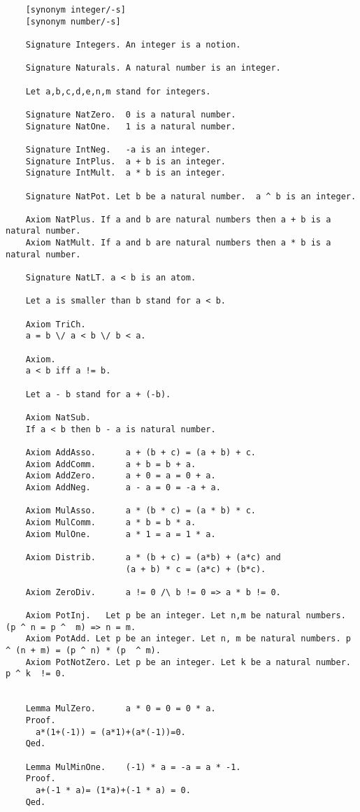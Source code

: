 \documentclass[a4paper,12pt]{scrartcl}
\begin{document}
\begin{lstlisting}
	[synonym integer/-s]
	[synonym number/-s]
	
	Signature Integers. An integer is a notion.
	
	Signature Naturals. A natural number is an integer.
	
	Let a,b,c,d,e,n,m stand for integers.
	
	Signature NatZero.  0 is a natural number.
	Signature NatOne.   1 is a natural number.
	
	Signature IntNeg.   -a is an integer.
	Signature IntPlus.  a + b is an integer.
	Signature IntMult.  a * b is an integer.
	
	Signature NatPot. Let b be a natural number.  a ^ b is an integer.
	
	Axiom NatPlus. If a and b are natural numbers then a + b is a natural number.
	Axiom NatMult. If a and b are natural numbers then a * b is a natural number.
	
	Signature NatLT. a < b is an atom.
	
	Let a is smaller than b stand for a < b.
	
	Axiom TriCh.
	a = b \/ a < b \/ b < a.
	
	Axiom.
	a < b iff a != b.
	
	Let a - b stand for a + (-b).
	
	Axiom NatSub.
	If a < b then b - a is natural number.
	
	Axiom AddAsso.      a + (b + c) = (a + b) + c.
	Axiom AddComm.      a + b = b + a.
	Axiom AddZero.      a + 0 = a = 0 + a.
	Axiom AddNeg.       a - a = 0 = -a + a.
	
	Axiom MulAsso.      a * (b * c) = (a * b) * c.
	Axiom MulComm.      a * b = b * a.
	Axiom MulOne.       a * 1 = a = 1 * a.
	
	Axiom Distrib.      a * (b + c) = (a*b) + (a*c) and
						(a + b) * c = (a*c) + (b*c).
	
	Axiom ZeroDiv.      a != 0 /\ b != 0 => a * b != 0.
	
	Axiom PotInj.   Let p be an integer. Let n,m be natural numbers. (p ^ n = p ^  m) => n = m.
	Axiom PotAdd. Let p be an integer. Let n, m be natural numbers. p ^ (n + m) = (p ^ n) * (p  ^ m).
	Axiom PotNotZero. Let p be an integer. Let k be a natural number. p ^ k  != 0.
	
	
	Lemma MulZero.      a * 0 = 0 = 0 * a.
	Proof.
	  a*(1+(-1)) = (a*1)+(a*(-1))=0.
	Qed.
	
	Lemma MulMinOne.    (-1) * a = -a = a * -1.
	Proof.
	  a+(-1 * a)= (1*a)+(-1 * a) = 0.
	Qed.
	

\end{lstlisting}
\end{document}
